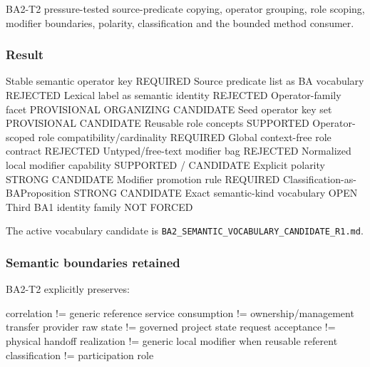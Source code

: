 \documentclass[
  10pt,
  letterpaper,
]{article}
\newenvironment{Shaded}{}{}
\newcommand{\NormalTok}[1]{#1}
\begin{document}
BA2-T2 pressure-tested source-predicate copying, operator grouping, role
scoping, modifier boundaries, polarity, classification and the bounded
method consumer.

\subsubsection{Result}\label{result}

\begin{Shaded}
\begin{Highlighting}[]
\NormalTok{Stable semantic operator key                 REQUIRED}
\NormalTok{Source predicate list as BA vocabulary       REJECTED}
\NormalTok{Lexical label as semantic identity            REJECTED}
\NormalTok{Operator{-}family facet                         PROVISIONAL ORGANIZING CANDIDATE}
\NormalTok{Seed operator key set                         PROVISIONAL CANDIDATE}
\NormalTok{Reusable role concepts                        SUPPORTED}
\NormalTok{Operator{-}scoped role compatibility/cardinality REQUIRED}
\NormalTok{Global context{-}free role contract             REJECTED}
\NormalTok{Untyped/free{-}text modifier bag                 REJECTED}
\NormalTok{Normalized local modifier capability           SUPPORTED / CANDIDATE}
\NormalTok{Explicit polarity                              STRONG CANDIDATE}
\NormalTok{Modifier promotion rule                        REQUIRED}
\NormalTok{Classification{-}as{-}BAProposition               STRONG CANDIDATE}
\NormalTok{Exact semantic{-}kind vocabulary                 OPEN}
\NormalTok{Third BA1 identity family                      NOT FORCED}
\end{Highlighting}
\end{Shaded}

The active vocabulary candidate is
\texttt{BA2\_SEMANTIC\_VOCABULARY\_CANDIDATE\_R1.md}.

\subsubsection{Semantic boundaries
retained}\label{semantic-boundaries-retained}

BA2-T2 explicitly preserves:

\begin{Shaded}
\begin{Highlighting}[]
\NormalTok{correlation           != generic reference}
\NormalTok{service consumption   != ownership/management transfer}
\NormalTok{provider raw state    != governed project state}
\NormalTok{request acceptance    != physical handoff}
\NormalTok{realization           != generic local modifier when reusable}
\NormalTok{referent classification != participation role}
\end{Highlighting}
\end{Shaded}
\end{document}
